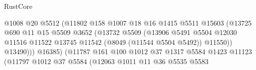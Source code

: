 \begin{lexlean}{RustCore}
\begin{coremodule}
                                            @1008
                                            @20
                                            @5512
                                            (@11802
                                              @158
                                              @1007
                                              @18
                                              @16
                                              @1415
                                              @5511
                                              @15603
                                              (@13725
                                                @690
                                                @11
                                                @15
                                                @5509
                                                @3652
                                                (@13732
                                                  @5509
                                                  (@13906
                                                    @5491
                                                    @5504
                                                    @12030
                                                    @11516
                                                    @11522
                                                    @13745
                                                    @11542
                                                    (@8049 (@11544 @5504 @5492))
                                                    @11550))
                                                @13490)))
                                          @16385)
                                        (@11787
                                          @161
                                          @100
                                          @1012
                                          @37
                                          @1317
                                          @5584
                                          @1423
                                          @11123
                                          (@11797
                                            @1012
                                            @37
                                            @5584
                                            (@12063
                                              @1011
                                              @11
                                              @36
                                              @5535
                                              @5583

\end{coremodule}
\end{lexlean}
